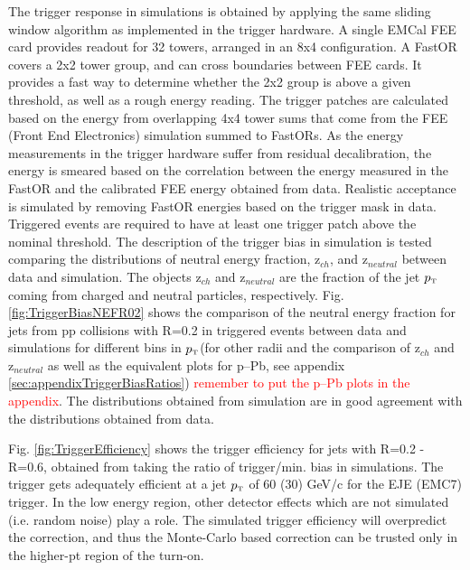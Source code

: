 \documentclass[ALICE]{ALICE_analysis_notes}
\newcommand{\pT}{$p_{\mbox{\tiny T}}$\xspace}
\newcommand{\pPb}{{\mbox{p--Pb}}\xspace}
\newcommand{\pp}{pp\xspace}
\begin{document}
The trigger response in simulations is obtained by applying the same sliding window algorithm as implemented in the trigger hardware. A single EMCal FEE card provides readout for 32 towers, arranged in an 8x4 configuration. A FastOR covers a 2x2 tower group, and can cross boundaries between FEE cards. It provides a fast way to determine whether the 2x2 group is above a given threshold, as well as a rough energy reading. The trigger patches are calculated based on the energy from overlapping 4x4 tower sums that come from the FEE (Front End Electronics) simulation summed to FastORs. As the energy measurements in the trigger hardware suffer from residual decalibration, the energy is smeared based on the correlation between the energy measured in the FastOR and the calibrated FEE energy obtained from data. Realistic acceptance is simulated by removing FastOR energies based on the trigger mask in data. Triggered events are required to have at least one trigger patch above the nominal threshold. The description of the trigger bias in simulation is tested comparing the distributions of neutral energy fraction, z$_{ch}$, and z$_{neutral}$ between data and simulation. The objects z$_{ch}$ and z$_{neutral}$ are the fraction of the jet \pT coming from charged and neutral particles, respectively. Fig. \ref{fig:TriggerBiasNEFR02} shows the comparison of the neutral energy fraction for jets from \pp collisions with R=0.2 in triggered events between data and simulations for different bins in \pT (for other radii and the comparison of z$_{ch}$ and z$_{neutral}$ as well as the equivalent plots for \pPb, see appendix \ref{sec:appendixTriggerBiasRatios}) \textcolor{red}{remember to put the \pPb plots in the appendix}. The distributions obtained from simulation are in good agreement with the distributions obtained from data. 

Fig. \ref{fig:TriggerEfficiency} shows the trigger efficiency for jets with R=0.2 - R=0.6, obtained from taking the ratio of trigger/min. bias in simulations. The trigger gets adequately efficient at a jet \pT of 60 (30) GeV/c for the EJE (EMC7) trigger. In the low energy region, other detector effects which are not simulated (i.e. random noise) play a role. The simulated trigger efficiency will overpredict the correction, and thus the Monte-Carlo based correction can be trusted only in the higher-pt region of the turn-on.
\end{document}
